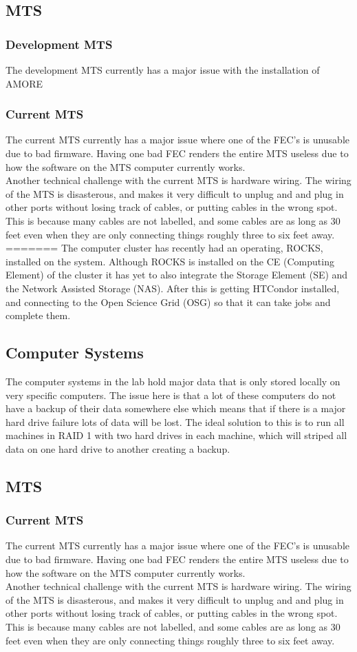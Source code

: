 \documentclass[12pt]{article}
\newcommand\tab[1][1cm]{\hspace*{#1}}
\begin{document}
\subsection{MTS}
\subsubsection{Development MTS}
\tab The development MTS currently has a major issue with the installation of AMORE
\subsubsection{Current MTS}
\tab The current MTS currently has a major issue where one of the FEC's is unusable due to bad firmware. Having one bad FEC renders the entire MTS useless due to how the software on the MTS computer currently works. \\
\tab Another technical challenge with the current MTS is hardware wiring. The wiring of the MTS is disasterous, and makes it very difficult to unplug and and plug in other ports without losing track of cables, or putting cables in the wrong spot. This is because many cables are not labelled, and some cables are as long as 30 feet even when they are only connecting things roughly three to six feet away. 
=======
\tab The computer cluster has recently had an operating, ROCKS, installed on the system. Although ROCKS is installed on the CE (Computing Element) of the cluster it has yet to also integrate the Storage Element (SE) and the Network Assisted Storage (NAS). After this is getting HTCondor installed, and connecting to the Open Science Grid (OSG) so that it can take jobs and complete them. 
\subsection{Computer Systems}
\tab The computer systems in the lab hold major data that is only stored locally on very specific computers. The issue here is that a lot of these computers do not have a backup of their data somewhere else which means that if there is a major hard drive failure lots of data will be lost. The ideal solution to this is to run all machines in RAID 1 with two hard drives in each machine, which will striped all data on one hard drive to another creating a backup. 
\subsection{MTS}
\subsubsection{Current MTS}
\tab The current MTS currently has a major issue where one of the FEC's is unusable due to bad firmware. Having one bad FEC renders the entire MTS useless due to how the software on the MTS computer currently works. \\
\tab Another technical challenge with the current MTS is hardware wiring. The wiring of the MTS is disasterous, and makes it very difficult to unplug and and plug in other ports without losing track of cables, or putting cables in the wrong spot. This is because many cables are not labelled, and some cables are as long as 30 feet even when they are only connecting things roughly three to six feet away.
\end{document}
